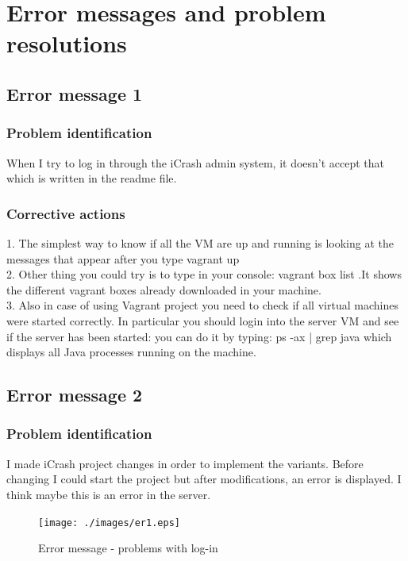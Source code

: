 
\chapter{Error messages and problem resolutions}
\label{chap:error_messages}

\section{Error message 1}

\subsection{Problem identification}
When I try to log in through the iCrash admin system, it doesn't accept that
which is written in the readme file.

\subsection{Corrective actions}
1. The simplest way to know if all the VM are up and running is looking at the
messages that appear after you type vagrant up \\
2. Other thing you could try is to type in your console: vagrant box list .It
shows the different vagrant boxes already downloaded in your machine.\\
3. Also in case of using Vagrant project you need to check if all virtual
machines were started correctly. In particular you should login into the server VM and see if the server has been started: you can do it by typing:  ps -ax | grep java which displays all Java processes running on the machine.



\section{Error message 2}

\subsection{Problem identification}
I made iCrash project changes in order to implement the variants. Before
changing I could start the project but after modifications, an error is
displayed. I think maybe this is an error in the server.\\

\begin{figure}
\begin{center}
\texttt{[image: ./images/er1.eps]}
\end{center}
\caption{Error message - problems with log-in}
\end{figure}

